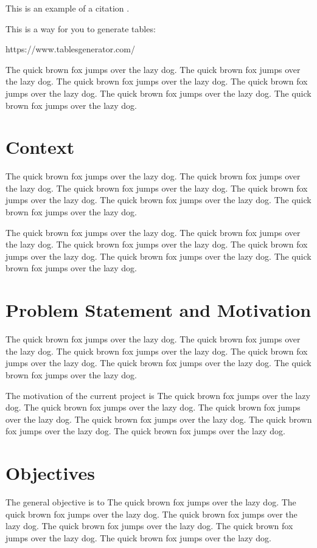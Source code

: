 \documentclass[11pt,a4paper]{report}
\begin{document}
This is an example of a citation \cite{Pedro2019}.

This is a way for you to generate tables:

https://www.tablesgenerator.com/

The quick brown fox jumps over the lazy dog. The quick brown fox jumps over the lazy dog. The quick brown fox jumps over the lazy dog. The quick brown fox jumps over the lazy dog. The quick brown fox jumps over the lazy dog. The quick brown fox jumps over the lazy dog.

\section{Context}
\label{sec:context}
The quick brown fox jumps over the lazy dog. The quick brown fox jumps over the lazy dog. The quick brown fox jumps over the lazy dog. The quick brown fox jumps over the lazy dog. The quick brown fox jumps over the lazy dog. The quick brown fox jumps over the lazy dog.

The quick brown fox jumps over the lazy dog. The quick brown fox jumps over the lazy dog. The quick brown fox jumps over the lazy dog. The quick brown fox jumps over the lazy dog. The quick brown fox jumps over the lazy dog. The quick brown fox jumps over the lazy dog.

\section{Problem Statement and Motivation}
\label{sec:motivation}
The quick brown fox jumps over the lazy dog. The quick brown fox jumps over the lazy dog. The quick brown fox jumps over the lazy dog. The quick brown fox jumps over the lazy dog. The quick brown fox jumps over the lazy dog. The quick brown fox jumps over the lazy dog.

The motivation of the current project is
The quick brown fox jumps over the lazy dog. The quick brown fox jumps over the lazy dog. The quick brown fox jumps over the lazy dog. The quick brown fox jumps over the lazy dog. The quick brown fox jumps over the lazy dog. The quick brown fox jumps over the lazy dog.

\section{Objectives}
\label{sec:name}
The general objective is to
The quick brown fox jumps over the lazy dog. The quick brown fox jumps over the lazy dog. The quick brown fox jumps over the lazy dog. The quick brown fox jumps over the lazy dog. The quick brown fox jumps over the lazy dog. The quick brown fox jumps over the lazy dog.
\end{document}
